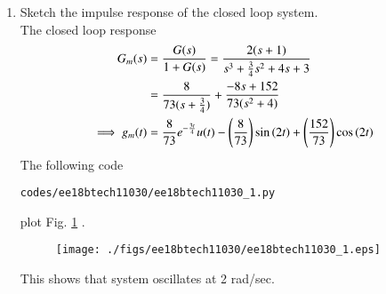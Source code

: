 \begin{enumerate}[label=\thesubsection.\arabic*.,ref=\thesubsection.\theenumi]
\item Sketch the impulse response of the closed loop system.
\\
\solution The closed loop response
\begin{align}
 G_{m}(s) &= \frac{G(s)}{1+G(s)}=\frac{2(s+1)}{s^3+\frac{3}{4}s^2+4s+3} 
\\
 &= \frac{8}{73(s+\frac{3}{4})}+ \frac{-8s+152}{73(s^2+4)}
\\
 \implies g_{m}(t) &= \frac{8}{73}e^{-\frac{3t}{4}}u(t)- \left(\frac{8}{73}\right)\sin\left(2t\right) +\left(\frac{152}{73}\right)\cos\left(2t\right)
\end{align}
%
The following code 
\begin{lstlisting}
codes/ee18btech11030/ee18btech11030_1.py
\end{lstlisting}
plot Fig. \ref{fig:ee18btech11030_sine} .
%
\begin{figure}[!h]
\centering
  \texttt{[image: ./figs/ee18btech11030/ee18btech11030\_1.eps]}
\caption{}
\label{fig:ee18btech11030_sine} 
\end{figure}
%
This shows that system oscillates at 2 rad/sec.
\end{enumerate}

